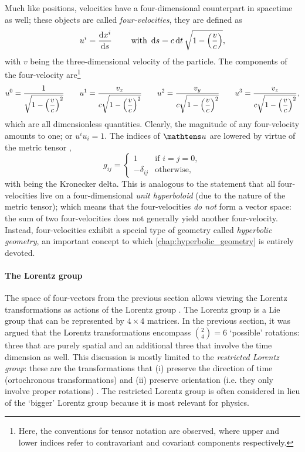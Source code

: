 Much like positions, velocities have a four-dimensional counterpart in spacetime as well; these objects are called \emph{four-velocities}, they are defined as \cite{Landau1971}
\[ u^i = \dv{x^i}{s} \qquad \text{ with } \dd{s} = c\dd{t} \sqrt{1 - \qty(\frac{v}{c})},\]
with \(v\) being the three-dimensional velocity of the particle. The components of the four-velocity  are\footnote{Here, the conventions for tensor notation are observed, where upper and lower indices refer to contravariant and covariant components respectively.}
\[ 
u^0 = \frac{\displaystyle 1}{\displaystyle \sqrt{1 - \qty(\frac{v}{c})^2}} 
\qquad  u^1 = \frac{\displaystyle v_x}{\displaystyle c\sqrt{1 - \qty(\frac{v}{c})^2}}
\qquad  u^2 = \frac{\displaystyle v_y}{\displaystyle c\sqrt{1 - \qty(\frac{v}{c})^2}}
\qquad  u^3 = \frac{\displaystyle v_z}{\displaystyle c\sqrt{1 - \qty(\frac{v}{c})^2}},
\]
which are all dimensionless quantities. Clearly, the magnitude of any four-velocity amounts to one; or \(u^i u_i = 1\). The indices of $\tens{u}$ are lowered by virtue of the metric tensor ,
\begin{equation} 
    g_{ij} = 
    \begin{cases}
        1 & \text{if } i = j = 0,\\
        -\delta_{ij} & \text{otherwise,}
    \end{cases}
    \label{eq:metric_tensor}
\end{equation}
with  being the Kronecker delta. 
This is analogous to the statement that all four-velocities live on a four-dimensional \emph{unit hyperboloid} (due to the nature of the metric tensor); which means that the four-velocities \emph{do not} form a vector space: the sum of two four-velocities does not generally yield another four-velocity. Instead, four-velocities exhibit a special type of geometry called \emph{hyperbolic geometry}, an important concept to which \cref{chap:hyperbolic_geometry} is entirely devoted.

\paragraph{The Lorentz group} The space of four-vectors from the previous section allows viewing the Lorentz transformations as actions of the Lorentz group . The Lorentz group is a Lie group that can be represented by $4\times4$ matrices. In the previous section, it was argued that the Lorentz transformations encompass $\binom{2}{4} = 6$ `possible' rotations: three that are purely spatial and an additional three that involve the time dimension as well. This discussion is mostly limited to the \emph{restricted Lorentz group}: these are the transformations that (i) preserve the direction of time (ortochronous transformations) and (ii) preserve orientation (i.e. they only involve proper rotations) \cite{Tung1985}. The restricted Lorentz group is often considered in lieu of the `bigger' Lorentz group because it is most relevant for physics.

